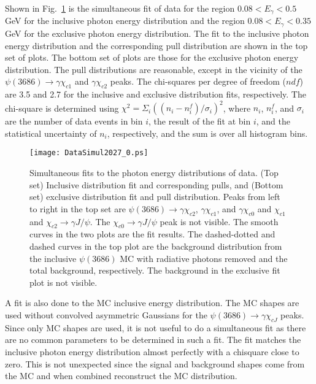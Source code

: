 \documentclass[aps,prd,twocolumn,showpacs,floatfix,byrevtex]{revtex4-1}
\begin{document}
Shown in Fig.~\ref{fit1} is the simultaneous fit of data for the
region $0.08 < E_{\gamma} < 0.5$ GeV for the inclusive photon energy
distribution and the region $0.08 < E_{\gamma} < 0.35$ GeV for the
exclusive photon energy distribution. The fit to the inclusive photon
energy distribution and the corresponding pull distribution are shown
in the top set of plots. The bottom set of plots are those for the
exclusive photon energy distribution.  The pull distributions are
reasonable, except in the vicinity of the $\psi(3686) \to \gamma
\chi_{c1}$ and $\gamma \chi_{c2}$ peaks.  The chi-squares per degree
of freedom ($ndf$) are 3.5 and 2.7 for the inclusive and exclusive
distribution fits, respectively.  The chi-square is determined using
$\chi^2 = \Sigma_i((n_i -n_i^f)/\sigma_i)^2$, where $n_i$, $n_i^f$,
and $\sigma_i$ are the number of data events in bin $i$, the result of
the fit at bin $i$, and the statistical uncertainty of $n_i$,
respectively, and the sum is over all histogram bins.

\begin{figure}[!htpb]
\centering
{\texttt{[image: DataSimul2027\_0.ps]}}  
\caption{\label{fit1} Simultaneous fits to the photon energy
  distributions of data. (Top set) Inclusive distribution fit and
  corresponding pulls, and (Bottom set) exclusive distribution fit and
  pull distribution.  Peaks from left to right in the top set are
  $\psi(3686) \to \gamma \chi_{c2}$, $\gamma \chi_{c1}$, and $\gamma
  \chi_{c0}$ and $\chi_{c1}$ and $\chi_{c2} \to
  \gamma J/\psi$.  The $\chi_{c0} \to \gamma J/\psi$ peak is not visible.
  The smooth curves in the two plots are the fit results. The
  dashed-dotted and dashed curves in the top plot are the background
  distribution from the inclusive $\psi(3686)$ MC with radiative
  photons removed and the total background, respectively.  The
  background in the exclusive fit plot is not visible.}
\end{figure}

A fit is also done to the MC inclusive energy distribution.  The MC
shapes are used without convolved asymmetric Gaussians for the
$\psi(3686) \to \gamma \chi_{cJ}$ peaks.  Since only MC shapes are
used, it is not useful to do a simultaneous fit as there are no common
parameters to be determined in such a fit.  The fit matches the
inclusive photon energy distribution almost perfectly with a chisquare
close to zero. This is not unexpected since the signal and background
shapes come from the MC and when combined reconstruct the MC
distribution.
\end{document}
